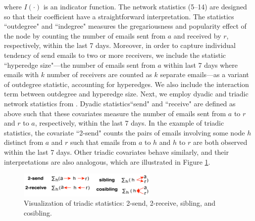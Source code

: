 \documentclass[ba]{imsart}
\numberwithin{equation}{section}
\theoremstyle{plain}
\begin{document}
 	   where $I(\cdot)$ is an indicator function. The network statistics (5--14) are designed so that their coefficient have a straightforward interpretation. The statistics ``outdegree" and ``indegree" measures the gregariousness and popularity effect of the node by counting the number of emails sent from $a$ and received by $r$, respectively, within the last 7 days. Moreover, in order to capture individual tendency of send emails to two or more receivers, we include the statistic ``hyperedge size"---the number of emails sent from $a$ within last 7 days where emails with $k$ number of receivers are counted as $k$ separate emails---as a variant of outdegree statistic, accounting for hyperedges. We also include the interaction term between outdegree and hyperedge size. Next, we employ dyadic and triadic network statistics from \cite{PerryWolfe2012}. Dyadic statistics``send" and ``receive" are defined as above such that these covariates measure the number of emails sent from $a$ to $r$ and $r$ to $a$, respectively, within the last 7 days. In the example of triadic statistics, the covariate ``2-send" counts the pairs of emails involving some node $h$ distinct from $a$ and $r$ such that emails from $a$ to $h$ and $h$ to $r$ are both observed within the last 7 days. Other triadic covariates behave similarly, and their interpretations are also analogous, which are illustrated in Figure \ref{figure:netstats}.
 	   \begin{figure}[!t]
 	   	\centering
 	   	\includegraphics[width=0.6\textwidth]{img/triad-1.png}	
 	   	\caption {Visualization of triadic statistics: 2-send, 2-receive, sibling, and cosibling.}
 	   	\label{figure:netstats}
 	   \end{figure}
 	   
\end{document}
